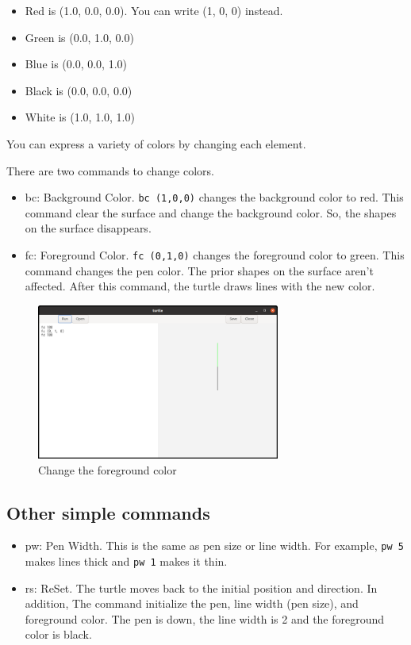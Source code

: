 \begin{itemize}
\tightlist
\item
  Red is (1.0, 0.0, 0.0). You can write (1, 0, 0) instead.
\item
  Green is (0.0, 1.0, 0.0)
\item
  Blue is (0.0, 0.0, 1.0)
\item
  Black is (0.0, 0.0, 0.0)
\item
  White is (1.0, 1.0, 1.0)
\end{itemize}

You can express a variety of colors by changing each element.

There are two commands to change colors.

\begin{itemize}
\tightlist
\item
  bc: Background Color. \passthrough{\lstinline!bc (1,0,0)!} changes the
  background color to red. This command clear the surface and change the
  background color. So, the shapes on the surface disappears.
\item
  fc: Foreground Color. \passthrough{\lstinline!fc (0,1,0)!} changes the
  foreground color to green. This command changes the pen color. The
  prior shapes on the surface aren't affected. After this command, the
  turtle draws lines with the new color.
\end{itemize}

\begin{figure}
\centering
\includegraphics[width=8cm,height=5.11cm]{../src/turtle/image/turtle3.png}
\caption{Change the foreground color}
\end{figure}

\hypertarget{other-simple-commands}{%
\subsection{Other simple commands}\label{other-simple-commands}}

\begin{itemize}
\tightlist
\item
  pw: Pen Width. This is the same as pen size or line width. For
  example, \passthrough{\lstinline!pw 5!} makes lines thick and
  \passthrough{\lstinline!pw 1!} makes it thin.
\item
  rs: ReSet. The turtle moves back to the initial position and
  direction. In addition, The command initialize the pen, line width
  (pen size), and foreground color. The pen is down, the line width is 2
  and the foreground color is black.
\end{itemize}

